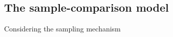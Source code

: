 \documentclass[
  authoryear,
  review,
  1p]{elsarticle}
\begin{document}
\begin{figure}


\caption{\label{fig-CJ_TM_10}}

\end{figure}%

\subsection{The sample-comparison
model}\label{sec-theory-theoretical_SC}

Considering the sampling mechanism

\begin{figure}


\caption{\label{fig-CJ_TM_12}}

\end{figure}%
\end{document}
